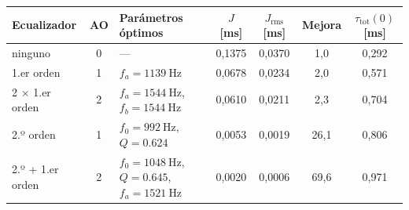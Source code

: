 \begin{tabular}{@{}lclcccc@{}}
\toprule
Ecualizador & AO & Parámetros óptimos & $J$ [ms] & $J_\text{rms}$ [ms] & Mejora & $\tau_\text{tot}(0)$ [ms] \\
\midrule
ninguno & 0 & --- & 0{,}1375 & 0{,}0370 & 1{,}0 & 0{,}292 \\
1.er orden & 1 & $f_a = \qty{1139}{\hertz}$ & 0{,}0678 & 0{,}0234 & 2{,}0 & 0{,}571 \\
2 $\times$ 1.er orden & 2 & $f_a = \qty{1544}{\hertz}$, $f_b = \qty{1544}{\hertz}$ & 0{,}0610 & 0{,}0211 & 2{,}3 & 0{,}704 \\
2.º orden & 1 & $f_0 = \qty{992}{\hertz}$, $Q = \num{0.624}$ & 0{,}0053 & 0{,}0019 & 26{,}1 & 0{,}806 \\
2.º + 1.er orden & 2 & $f_0 = \qty{1048}{\hertz}$, $Q = \num{0.645}$, $f_a = \qty{1521}{\hertz}$ & 0{,}0020 & 0{,}0006 & 69{,}6 & 0{,}971 \\
\bottomrule
\end{tabular}
